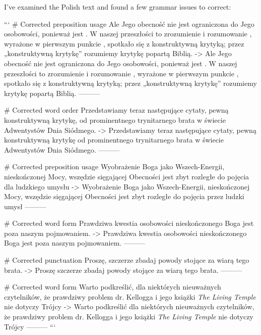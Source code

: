 I've examined the Polish text and found a few grammar issues to correct:

```
# Corrected preposition usage
Ale Jego obecność nie jest ograniczona do Jego osobowości, ponieważ jest . W naszej przeszłości to zrozumienie i rozumowanie , wyrażone w pierwszym punkcie , spotkało się z konstruktywną krytyką; przez „konstruktywną krytykę” rozumiemy krytykę popartą Biblią.
->
Ale Jego obecność nie jest ograniczona do Jego osobowości, ponieważ jest . W naszej przeszłości to zrozumienie i rozumowanie , wyrażone w pierwszym punkcie , spotkało się z konstruktywną krytyką; przez „konstruktywną krytykę” rozumiemy krytykę popartą Biblią.
---------

# Corrected word order
Przedstawiamy teraz następujące cytaty, pewną konstruktywną krytykę, od prominentnego trynitarnego brata w świecie Adwentystów Dnia Siódmego.
->
Przedstawiamy teraz następujące cytaty, pewną konstruktywną krytykę od prominentnego trynitarnego brata w świecie Adwentystów Dnia Siódmego.
---------

# Corrected preposition usage
Wyobrażenie Boga jako Wszech-Energii, nieskończonej Mocy, wszędzie sięgającej Obecności jest zbyt rozległe  do pojęcia dla ludzkiego umysłu
->
Wyobrażenie Boga jako Wszech-Energii, nieskończonej Mocy, wszędzie sięgającej Obecności jest zbyt rozległe do pojęcia przez ludzki umysł
---------

# Corrected word form
Prawdziwa kwestia osobowości nieskończonego Boga jest poza naszym pojmowaniem.
->
Prawdziwa kwestia osobowości nieskończonego Boga jest poza naszym pojmowaniem.
---------

# Corrected punctuation
Proszę, szczerze zbadaj powody stojące za wiarą tego brata.
->
Proszę szczerze zbadaj powody stojące za wiarą tego brata.
---------

# Corrected word form
Warto podkreślić, dla niektórych nieuważnych czytelników, że prawdziwy problem dr. Kellogga i jego książki \textit{The Living Temple} nie dotyczy Trójcy
->
Warto podkreślić dla niektórych nieuważnych czytelników, że prawdziwy problem dr. Kellogga i jego książki \textit{The Living Temple} nie dotyczy Trójcy
---------
```